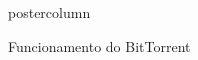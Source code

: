 \documentclass[final,brazil]{beamer}
\newcommand{\blockouterspace}{\vskip1ex}
\newenvironment{innercol}{
\begin{columns}
  \begin{column}{.93\textwidth}
    \justifying
}{
  \end{column}
\end{columns}
}
\newlength{\columnheight}
\begin{document}
\begin{frame}
\begin{columns}
\begin{column}{.49\textwidth}
\begin{beamercolorbox}[center,wd=\textwidth]{postercolumn}
\begin{minipage}[T]{.95\textwidth}
{\begin{block}{Funcionamento do BitTorrent}
\begin{columns}[t,\textwidth]
                \begin{column}{.46\textwidth}
                  \justifying
                  \blindtext
                  \blindtext
                \end{column}
              \end{columns}
            \end{block}
          }
        \end{minipage}
      \end{beamercolorbox}
    \end{column}

    \begin{column}{.24\textwidth}
\end{column}
\end{columns}
\end{frame}
\end{document}
